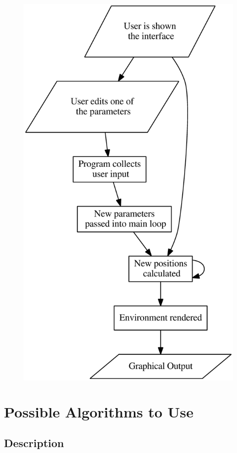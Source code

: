 \begin{figure}[h]
	\includegraphics[scale=0.23]{./img/flow.eps}
	\label{fig:flow}	
\end{figure}

\section{Possible Algorithms to Use}

%
\subsection{Description}

